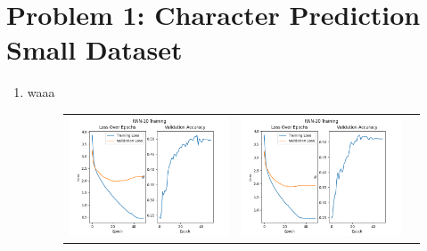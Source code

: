 \documentclass{article}
\begin{document}


\section{Problem 1: Character Prediction Small Dataset}

\begin{enumerate}[label=1\alph*. ]
    \item waaa
    \begin{figure}[htb]
        \setlength\tabcolsep{2pt}
        \begin{tabularx}{\textwidth}{XXX}
          \includegraphics{images_p1/RNN_10_training_new.png} &
          \includegraphics{images_p1/RNN_20_training_new.png} &

\end{tabularx}
\end{figure}
\end{enumerate}
\end{document}
